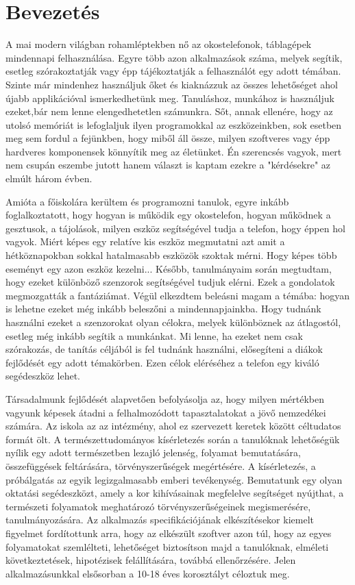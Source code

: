 \documentclass{thesis-ekf}
\theoremstyle{definition}
\theoremstyle{remark}
\begin{document}
\chapter{Bevezetés}
A mai modern világban rohamléptekben nő az okostelefonok, táblagépek mindennapi felhasználása. Egyre több azon alkalmazások száma, melyek segítik, esetleg szórakoztatják vagy épp tájékoztatják a felhasználót egy adott témában. 
Szinte már mindenhez használjuk őket és kiaknázzuk az összes lehetőséget ahol újabb applikációval ismerkedhetünk meg.
Tanuláshoz, munkához is használjuk ezeket,bár nem lenne elengedhetetlen számunkra.
Sőt, annak ellenére, hogy az utolsó memóriát is lefoglaljuk ilyen programokkal az eszközeinkben, sok esetben meg sem fordul a fejünkben, hogy miből áll össze, milyen szoftveres vagy épp hardveres komponensek könnyítik meg az életünket. Én szerencsés vagyok, mert nem csupán eszembe jutott hanem választ is kaptam ezekre a "kérdésekre" az elmúlt három évben.
\par Amióta a főiskolára kerültem és programozni tanulok, egyre inkább foglalkoztatott, hogy hogyan is működik egy okostelefon, hogyan működnek a gesztusok, a tájolások, milyen eszköz segítségével tudja a telefon, hogy éppen hol vagyok. Miért képes egy relatíve kis eszköz megmutatni azt amit a hétköznapokban sokkal hatalmasabb eszközök szoktak mérni. Hogy képes több eseményt egy azon eszköz kezelni...
Később, tanulmányaim során megtudtam, hogy ezeket különböző szenzorok segítségével tudjuk elérni. 
Ezek a gondolatok megmozgatták a fantáziámat. Végül elkezdtem beleásni magam a témába: hogyan is lehetne ezeket még inkább beleszőni a mindennapjainkba. Hogy tudnánk használni ezeket a szenzorokat olyan célokra, melyek különböznek az átlagostól, esetleg még inkább segítik a munkánkat. Mi lenne, ha ezeket nem csak szórakozás, de tanítás céljából is fel tudnánk használni, elősegíteni a diákok fejlődését egy adott témakörben. Ezen célok eléréséhez a telefon egy kiváló segédeszköz lehet.

\par Társadalmunk fejlődését alapvetően befolyásolja az, hogy milyen mértékben vagyunk képesek átadni a felhalmozódott tapasztalatokat a jövő nemzedékei számára. Az iskola az az intézmény, ahol ez szervezett keretek között céltudatos formát ölt. A természettudományos kísérletezés során a tanulóknak lehetőségük nyílik egy adott természetben lezajló jelenség, folyamat bemutatására, összefüggések feltárására, törvényszerűségek megértésére. A kísérletezés, a próbálgatás az egyik legizgalmasabb emberi tevékenység.  Bemutatunk egy olyan oktatási segédeszközt, amely a kor kihívásainak megfelelve segítséget nyújthat, a természeti folyamatok meghatározó törvényszerűségeinek megismerésére, tanulmányozására. Az alkalmazás specifikációjának elkészítésekor kiemelt figyelmet fordítottunk arra, hogy az elkészült szoftver azon túl, hogy az egyes folyamatokat szemlélteti, lehetőséget biztosítson majd a tanulóknak, elméleti következtetések, hipotézisek felállítására, továbbá ellenőrzésére. Jelen alkalmazásunkkal elsősorban a 10-18 éves korosztályt céloztuk meg.
\end{document}
